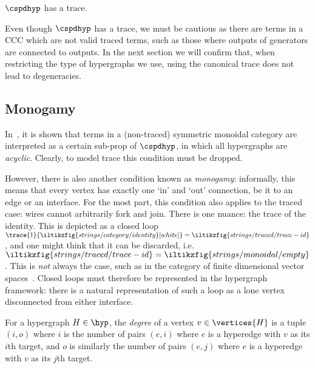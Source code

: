 \begin{corollary}
    \(\cspdhyp\) has a trace.
\end{corollary}

Even though \(\cspdhyp\) has a trace, we must be cautious as there are terms in
a CCC which are not valid traced terms, such as those where
outputs of generators are connected to outputs.
In the next section we will confirm that, when restricting the type of
hypergraphs we use, using the canonical trace does not lead to degeneracies.

\subsection{Monogamy}

In~\cite{bonchi2016rewriting}, it is shown that terms in a (non-traced)
symmetric monoidal category are interpreted as a certain sub-prop of
\(\cspdhyp\), in which all hypergraphs are \emph{acyclic}.
Clearly, to model trace this condition must be dropped.

However, there is also another condition known as \emph{monogamy}: informally,
this means that every vertex has exactly one `in' and `out' connection, be it to
an edge or an interface.
For the most part, this condition also applies to the traced case: wires cannot
arbitrarily fork and join.
There is one nuance: the trace of the identity.
This is depicted as a closed loop \(
    \trace{1}{\iltikzfig{strings/category/identity}[white]}
    =
    \iltikzfig{strings/traced/trace-id}
\), and one might think that it can be discarded, i.e. \(
    \iltikzfig{strings/traced/trace-id}
    =
    \iltikzfig{strings/monoidal/empty}
\).
This is \emph{not} always the case, such as in the category of finite
dimensional vector spaces~\cite[Sec. 6.1]{hasegawa1997recursion}.
Closed loops must therefore be represented in the hypergraph framework:
there is a natural representation of such a loop as a lone vertex disconnected
from either interface.

\begin{definition}
    For a hypergraph \(H \in \hyp\), the \emph{degree} of a vertex
    \(v \in \vertices{H}\) is a tuple \((i,o)\) where \(i\) is the number of
    pairs \((e,i)\) where \(e\) is a hyperedge with \(v\) as its \(i\)th target,
    and \(o\) is similarly the number of pairs \((e,j)\) where \(e\) is a
    hyperedge with \(v\) as its \(j\)th target.
\end{definition}

